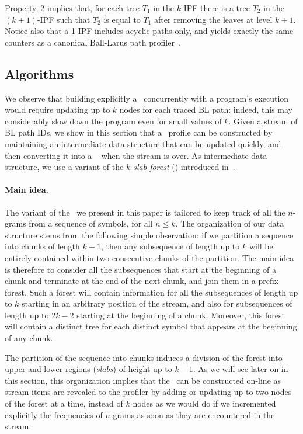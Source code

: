 Property~2 implies that, for each tree $T_1$ in the $k$-IPF there is a tree $T_2$ in the $(k+1)$-IPF such that $T_2$ is equal to $T_1$ after removing the leaves at level $k+1$.
Notice also that a 1-IPF includes acyclic paths only, and yields exactly the same counters as a canonical Ball-Larus path profiler~\cite{Ball96}.


\subsection{Algorithms}

We observe that building explicitly a \kipf\ concurrently with a program's execution would require updating up to $k$ nodes for each traced BL path: indeed, this may considerably slow down the program even for small values of $k$. Given a stream of BL path IDs, we show in this section that a \kipf\ profile can be constructed by maintaining an intermediate data structure that can be updated quickly, and then converting it into a \kipf\
when the stream is over. As intermediate data structure, we use a variant of the {\em $k$-slab forest} (\ksf) introduced in~\cite{Ausiello12}.

\paragraph*{Main idea.} The variant of the \ksf\ we present in this paper is tailored to keep track of all the $n$-grams from a sequence of symbols, for all $n\le k$. The organization of our data structure stems from the following simple observation: if we partition a sequence into chunks of length $k-1$, then any subsequence of length up to $k$ will be entirely contained within two consecutive chunks of the partition. The main idea is therefore to consider all the subsequences that start at the beginning of a chunk and terminate at the end of the next chunk, and join them in a prefix forest. Such a forest will contain information for all the subsequences of length up to $k$ starting in an arbitrary position of the stream, and also for subsequences of length up to $2k-2$ starting at the beginning of a chunk. Moreover, this forest will contain a distinct tree for each distinct symbol that appears at the beginning of any chunk.

The partition of the sequence into chunks induces a division of the forest into upper and lower regions ({\em slabs}) of height up to $k-1$. As we will see later on in this section, this organization implies that the \ksf\ can be constructed on-line as stream items are revealed to the profiler by adding or updating up to two nodes of the forest at a time, instead of $k$ nodes as we would do if we incremented explicitly the frequencies of $n$-grams as soon as they are encountered in the stream.

